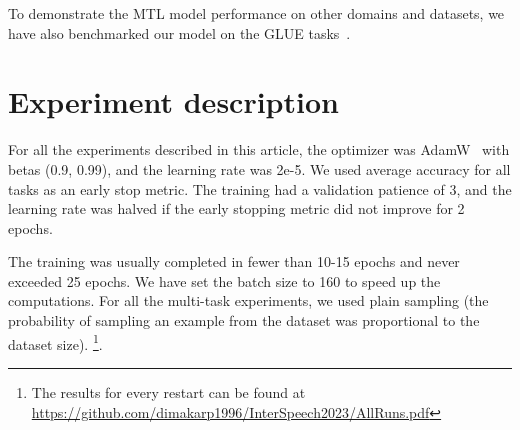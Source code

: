 To demonstrate the MTL model performance on other domains and datasets, we have also benchmarked our model on the GLUE tasks~\cite{GLUE:19}.
\section {Experiment description}

For all the experiments described in this article, the optimizer was AdamW~\cite{adam} with betas (0.9, 0.99), and the learning rate was 2e-5.%
We used average accuracy for all tasks as an early stop metric. The training had a validation patience of 3, and the learning rate was halved if the early stopping metric did not improve for 2 epochs. 

The training was usually completed in fewer than 10-15 epochs and never exceeded 25 epochs.%
We have set the batch size to 160 to speed up the computations. For all the multi-task experiments, we used plain sampling (the probability of sampling an example from the dataset was proportional to the dataset size). 
\ifinterspeechfinal
\footnote{The results for every restart can be found at \url{https://github.com/dimakarp1996/InterSpeech2023/AllRuns.pdf}}.
\fi
\begin{table}
 \caption{Classification tasks with corresponding datasets for the conversational multi-task learning model}
 \label{tab:task_sizes}
\centering
{}
\end{table}
